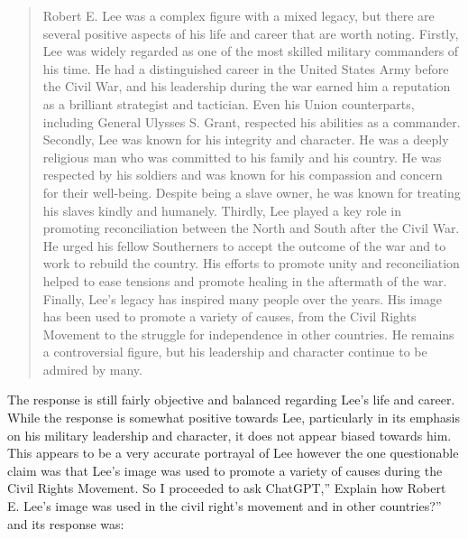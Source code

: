 \documentclass[letterpaper, 10pt, conference]{ieeeconf}
\begin{document}
    \begin{quote}
        
    Robert E. Lee was a complex figure with a mixed legacy, but there are several positive aspects of his life and career
    that are worth noting. Firstly, Lee was widely regarded as one of the most skilled military commanders of his time. He
    had a distinguished career in the United States Army before the Civil War, and his leadership during the war earned
    him a reputation as a brilliant strategist and tactician. Even his Union counterparts, including General Ulysses S.
    Grant, respected his abilities as a commander. Secondly, Lee was known for his integrity and character. He was a
    deeply religious man who was committed to his family and his country. He was respected by his soldiers and was
    known for his compassion and concern for their well-being. Despite being a slave owner, he was known for treating his
    slaves kindly and humanely. Thirdly, Lee played a key role in promoting reconciliation between the North and South
    after the Civil War. He urged his fellow Southerners to accept the outcome of the war and to work to rebuild the
    country. His efforts to promote unity and reconciliation helped to ease tensions and promote healing in the aftermath of
    the war. Finally, Lee's legacy has inspired many people over the years. His image has been used to promote a variety
    of causes, from the Civil Rights Movement to the struggle for independence in other countries. He remains a
    controversial figure, but his leadership and character continue to be admired by many\cite{navarburnett2023}.
    \end{quote}
    The response is still fairly objective and balanced regarding Lee’s life and career. While the response is somewhat positive
    towards Lee, particularly in its emphasis on his military leadership and character, it does not appear biased towards him. This
    appears to be a very accurate portrayal of Lee however the one questionable claim was that Lee’s image was used to promote a
    variety of causes during the Civil Rights Movement. So I proceeded to ask ChatGPT,” Explain how Robert E. Lee's image was
    used in the civil right's movement and in other countries?” and its response was:
\end{document}
